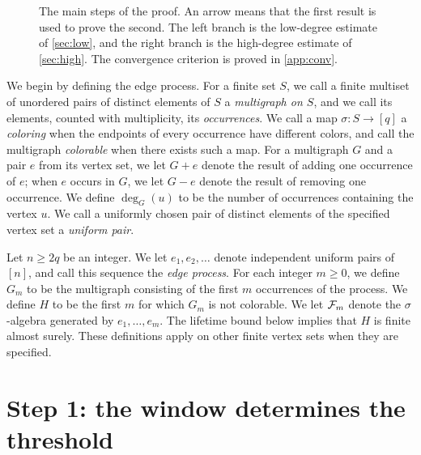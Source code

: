 \begin{figure}[t]
\centering

\caption{The main steps of the proof. An arrow means that the first result is used to prove the second. The left branch is the low-degree estimate of \cref{sec:low}, and the right branch is the high-degree estimate of \cref{sec:high}. The convergence criterion is proved in \cref{app:conv}.}
\label{fig:ov-dependencies}
\end{figure}

We begin by defining the edge process. For a finite set $S$, we call a finite multiset of unordered pairs of distinct elements of $S$ a \emph{multigraph on $S$}, and we call its elements, counted with multiplicity, its \emph{occurrences}. We call a map $\sigma:S \to [q]$ a \emph{coloring} when the endpoints of every occurrence have different colors, and call the multigraph \emph{colorable} when there exists such a map. For a multigraph $G$ and a pair $e$ from its vertex set, we let $G + e$ denote the result of adding one occurrence of $e$; when $e$ occurs in $G$, we let $G - e$ denote the result of removing one occurrence. We define $\deg_G(u)$ to be the number of occurrences containing the vertex $u$. We call a uniformly chosen pair of distinct elements of the specified vertex set a \emph{uniform pair}.

Let $n \ge 2q$ be an integer. We let $e_1, e_2, \dots$ denote independent uniform pairs of $[n]$, and call this sequence the \emph{edge process}. For each integer $m \ge 0$, we define $G_m$ to be the multigraph consisting of the first $m$ occurrences of the process. We define $H$ to be the first $m$ for which $G_m$ is not colorable. We let $\mathcal F_m$ denote the $\sigma$-algebra generated by $e_1, \dots, e_m$. The lifetime bound below implies that $H$ is finite almost surely. These definitions apply on other finite vertex sets when they are specified.

\section{Step 1: the window determines the threshold}\label{sec:ov-convergence}

